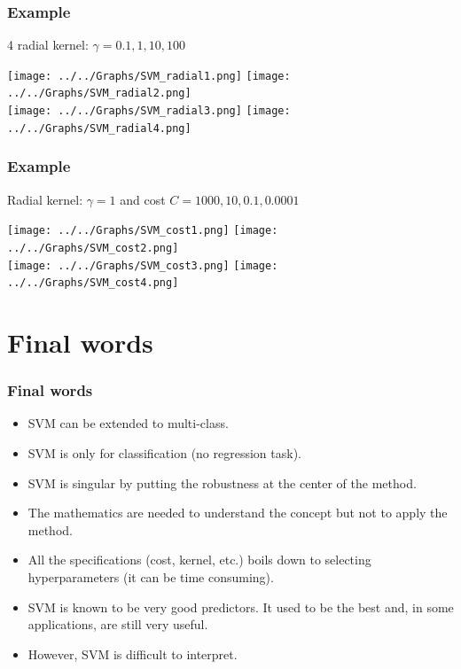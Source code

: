 \begin{frame}
\frametitle{Example}
\scriptsize
4 radial kernel: $\gamma=0.1, 1, 10, 100$ 
\normalsize
\begin{center}
\texttt{[image: ../../Graphs/SVM\_radial1.png]} 
\texttt{[image: ../../Graphs/SVM\_radial2.png]} \\
\texttt{[image: ../../Graphs/SVM\_radial3.png]} 
\texttt{[image: ../../Graphs/SVM\_radial4.png]} 
\end{center}
\end{frame}
\begin{frame}
\frametitle{Example}
\scriptsize
Radial kernel: $\gamma=1$ and cost $C=1000, 10, 0.1, 0.0001$ 
\normalsize
\begin{center}
\texttt{[image: ../../Graphs/SVM\_cost1.png]} 
\texttt{[image: ../../Graphs/SVM\_cost2.png]} \\
\texttt{[image: ../../Graphs/SVM\_cost3.png]} 
\texttt{[image: ../../Graphs/SVM\_cost4.png]} 
\end{center}
\end{frame}
\section{Final words}
\begin{frame}
\frametitle{Final words}
\begin{itemize}
\item SVM can be extended to multi-class.
\item SVM is only for classification (no regression task).
\item SVM is singular by putting the robustness at the center of the method.
\item The mathematics are needed to understand the concept but not to apply the method.
\item All the specifications (cost, kernel, etc.) boils down to selecting hyperparameters (it can be time consuming).
\item SVM is known to be very good predictors. It used to be the best and, in some applications, are still very useful. 
\item However, SVM is difficult to interpret.
\end{itemize}
\end{frame}


